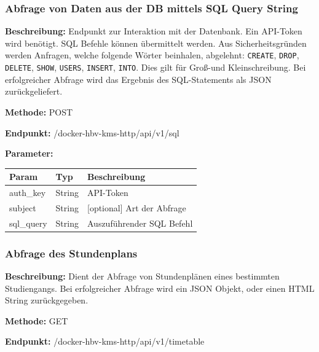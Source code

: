 \subsubsection{Abfrage von Daten aus der DB mittels SQL Query String}
\label{sec:api-sql-query}
\textbf{Beschreibung:} Endpunkt zur Interaktion mit der Datenbank. Ein API-Token wird benötigt. SQL Befehle können übermittelt werden. Aus Sicherheitsgründen werden Anfragen, welche folgende Wörter beinhalen, abgelehnt: \verb|CREATE|, \verb|DROP|, \verb|DELETE|, \verb|SHOW|, \verb|USERS|, \verb|INSERT|, \verb|INTO|. Dies gilt für Groß-und Kleinschreibung. Bei erfolgreicher Abfrage wird das Ergebnis des SQL-Statements als JSON zurückgeliefert.

\textbf{Methode:} POST

\textbf{Endpunkt:} /docker-hbv-kms-http/api/v1/sql

\textbf{Parameter:}
\begin{table}[H]
    \label{table:/docker-hbv-kms-http/api/v1/sql}
    \setlength{\tabcolsep}{3pt}
    \begin{tabular}{p{100pt}p{80pt}p{200pt}}
        \toprule
        Param      & Typ    & Beschreibung               \\
        \midrule
        auth\_key  & String & API-Token                  \\
        subject    & String & [optional] Art der Abfrage \\
        sql\_query & String & Auszuführender SQL Befehl  \\
        \bottomrule
    \end{tabular}
\end{table}
\dotfill

\subsubsection{Abfrage des Stundenplans}
\label{sec:api-timetable}
\textbf{Beschreibung:} Dient der Abfrage von Stundenplänen eines bestimmten Studiengangs. Bei erfolgreicher Abfrage wird ein JSON Objekt, oder einen HTML String zurückgegeben.

\textbf{Methode:} GET

\textbf{Endpunkt:} /docker-hbv-kms-http/api/v1/timetable

